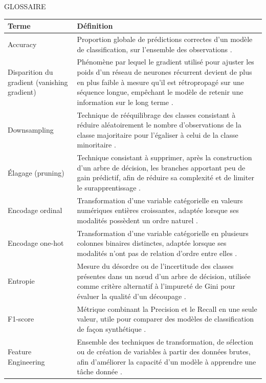 \documentclass[a4paper,12pt, oneside]{article}
\begin{document}
\vspace*{\fill}
\newpage

\begin{center}
\LARGE GLOSSAIRE
\end{center}

\begin{longtable}{@{}p{4cm}p{13cm}@{}}
\textbf{Terme} & \textbf{Définition} \\
\midrule

Accuracy & Proportion globale de prédictions correctes d'un modèle de classification, sur l'ensemble des observations \cite{scikitlearn}. \\[24pt]
Disparition du gradient (vanishing gradient) & Phénomène par lequel le gradient utilisé pour ajuster les poids d'un réseau de neurones récurrent devient de plus en plus faible à mesure qu'il est rétropropagé sur une séquence longue, empêchant le modèle de retenir une information sur le long terme \cite{hochreiter1997}. \\[24pt]
Downsampling & Technique de rééquilibrage des classes consistant à réduire aléatoirement le nombre d'observations de la classe majoritaire pour l'égaliser à celui de la classe minoritaire \cite{imblearndoc}. \\[24pt]
Élagage (pruning) & Technique consistant à supprimer, après la construction d'un arbre de décision, les branches apportant peu de gain prédictif, afin de réduire sa complexité et de limiter le surapprentissage \cite{scikitlearn}. \\[24pt]
Encodage ordinal & Transformation d'une variable catégorielle en valeurs numériques entières croissantes, adaptée lorsque ses modalités possèdent un ordre naturel \cite{scikitlearn}. \\[24pt]
Encodage one-hot & Transformation d'une variable catégorielle en plusieurs colonnes binaires distinctes, adaptée lorsque ses modalités n'ont pas de relation d'ordre entre elles \cite{scikitlearn}. \\[24pt]
Entropie & Mesure du désordre ou de l'incertitude des classes présentes dans un nœud d'un arbre de décision, utilisée comme critère alternatif à l'impureté de Gini pour évaluer la qualité d'un découpage \cite{scikitlearn}. \\[24pt]
F1-score & Métrique combinant la Precision et le Recall en une seule valeur, utile pour comparer des modèles de classification de façon synthétique \cite{scikitlearn}. \\[24pt]
Feature Engineering & Ensemble des techniques de transformation, de sélection ou de création de variables à partir des données brutes, afin d'améliorer la capacité d'un modèle à apprendre une tâche donnée \cite{scikitlearn}. \\[24pt]

\end{longtable}
\end{document}
